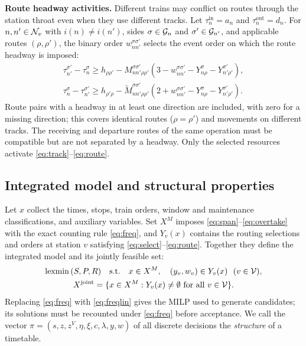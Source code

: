 \textbf{Route headway activities.} Different trains may conflict on routes through the station throat even when they use different tracks. Let $\tau^{\mathrm{in}}_n=a_n$ and $\tau^{\mathrm{out}}_n=d_n$. For $n,n'\in\mathcal{N}_v$ with $i(n)\ne i(n')$, sides $\sigma\in\mathcal{G}_n$ and $\sigma'\in\mathcal{G}_{n'}$, and applicable routes $(\rho,\rho')$, the binary order $w^{\sigma\sigma'}_{nn'}$ selects the event order on which the route headway is imposed:
\begin{equation}
\begin{gathered}
\tau^{\sigma'}_{n'}-\tau^\sigma_n\ge h_{\rho\rho'}-M^{\sigma\sigma'}_{nn'\rho\rho'}(3-w^{\sigma\sigma'}_{nn'}-Y^\sigma_{n\rho}-Y^{\sigma'}_{n'\rho'}),\\
\tau^\sigma_n-\tau^{\sigma'}_{n'}\ge h_{\rho'\rho}-\tilde M^{\sigma\sigma'}_{nn'\rho\rho'}(2+w^{\sigma\sigma'}_{nn'}-Y^\sigma_{n\rho}-Y^{\sigma'}_{n'\rho'}).
\end{gathered}\label{eq:route}
\end{equation}
Route pairs with a headway in at least one direction are included, with zero for a missing direction; this covers identical routes ($\rho=\rho'$) and movements on different tracks. The receiving and departure routes of the same operation must be compatible but are not separated by a headway. Only the selected resources activate \eqref{eq:track}--\eqref{eq:route}.

\subsection{Integrated model and structural properties}\label{sec:integrated}
Let $x$ collect the times, stops, train orders, window and maintenance classifications, and auxiliary variables. Set $X^M$ imposes \eqref{eq:span}--\eqref{eq:overtake} with the exact counting rule \eqref{eq:freq}, and $Y_v(x)$ contains the routing selections and orders at station $v$ satisfying \eqref{eq:select}--\eqref{eq:route}. Together they define the integrated model and its jointly feasible set:
\begin{equation}
\begin{gathered}
\operatorname{lexmin}\,(S,P,R)\quad\text{s.t.}\quad x\in X^M,\quad (y_v,w_v)\in Y_v(x)\ \ (v\in\Vset),\\
X^{\mathrm{joint}}=\{x\in X^M:Y_v(x)\ne\emptyset\ \text{for all}\ v\in\Vset\}.
\end{gathered}\label{eq:model}
\end{equation}
Replacing \eqref{eq:freq} with \eqref{eq:freqlin} gives the MILP used to generate candidates; its solutions must be recounted under \eqref{eq:freq} before acceptance. We call the vector $\pi=(s,z,z^V,\eta,\xi,c,\lambda,y,w)$ of all discrete decisions the \emph{structure} of a timetable.

